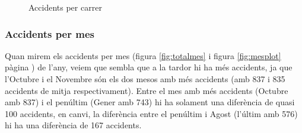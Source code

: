 \begin{figure}[H]
\footnotesize
\centering
{}%
\caption{Accidents per carrer}
\label{fig:totalcarrer}
\end{figure}

\subsubsection*{Accidents per mes}

Quan mirem els accidents per mes (figura \ref{fig:totalmes} i figura \ref{fig:mesplot} pàgina \pageref{fig:mesplot}) de l'any, veiem que sembla que a la tardor hi ha més accidents, ja que l'Octubre i el Novembre són els dos mesos amb més accidents (amb 837 i 835 accidents de mitja respectivament). Entre el mes amb més accidents (Octubre amb 837) i el penúltim (Gener amb 743) hi ha solament una diferència de quasi 100 accidents, en canvi, la diferència entre el penúltim i Agost (l'últim amb 576) hi ha una diferència de 167 accidents.


